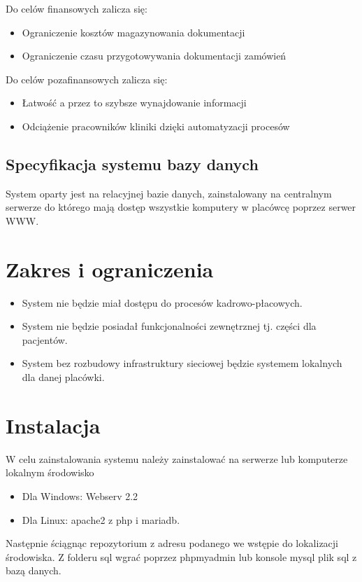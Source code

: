 \documentclass[10pt,a4paper]{article}
\begin{document}
	Do celów finansowych zalicza się:
	\begin{itemize}
		\item Ograniczenie kosztów magazynowania dokumentacji
		\item Ograniczenie czasu przygotowywania dokumentacji zamówień 
		
	\end{itemize}
	Do celów pozafinansowych zalicza się:
	\begin{itemize}
		\item Łatwość a przez to szybsze wynajdowanie informacji
		\item Odciążenie pracowników kliniki dzięki automatyzacji procesów
	\end{itemize}

	\subsection{Specyfikacja systemu bazy danych}
	System oparty jest na relacyjnej bazie danych, zainstalowany na centralnym serwerze do którego mają dostęp wszystkie komputery w placówcę poprzez serwer WWW.
	
	\section{Zakres i ograniczenia}
	\begin{itemize}
		\item System nie będzie miał dostępu do procesów kadrowo-płacowych. 
		\item System nie będzie posiadał funkcjonalności zewnętrznej tj. części dla pacjentów.
		\item System bez rozbudowy infrastruktury sieciowej będzie systemem lokalnych dla danej placówki.
	\end{itemize}
	


	\section {Instalacja}
		W celu zainstalowania systemu należy zainstalować na serwerze lub komputerze lokalnym środowisko
		\begin{itemize}
			\item Dla Windows: Webserv 2.2
			\item Dla Linux: apache2 z php i mariadb.
		\end{itemize}
	Następnie ściągnąc repozytorium z adresu podanego we wstępie do lokalizacji środowiska. Z folderu sql wgrać poprzez phpmyadmin lub konsole mysql plik sql z bazą danych. 
	
\end{document}
